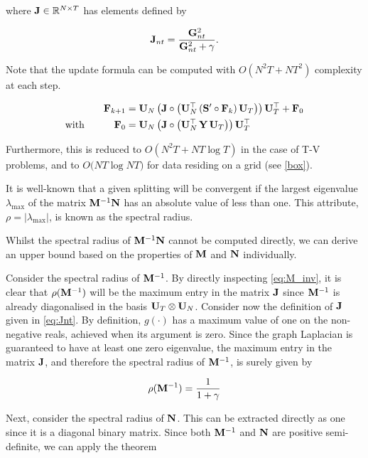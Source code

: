 \noindent where $\mathbf{J} \in \mathbb{R}^{N \times T}$ has elements defined by

\begin{equation}
    \label{eq:Jnt}
    \mathbf{J}_{nt} = \frac{\mathbf{G}_{nt}^2}{\mathbf{G}_{nt}^2 + \gamma}.
\end{equation}

Note that the update formula can be computed with $O(N^2T + NT^2)$ complexity at each step.  


\begin{align}
    \label{eq:update3}
    \mathbf{F}_{k+1} & = \mathbf{U}_N \, \big( \mathbf{J}  \circ \big( \mathbf{U}_N^\top \, (\mathbf{S}' \circ \mathbf{F}_{k})\, \mathbf{U}_T \big) \big) \, \mathbf{U}_T^\top + \mathbf{F}_0 \\
    \label{eq:update4}
    \text{with} \quad\quad\quad \mathbf{F}_0 & = \mathbf{U}_N \, \big( \mathbf{J}  \circ \big( \mathbf{U}_N^\top \, \mathbf{Y} \, \mathbf{U}_T \big) \big) \, \mathbf{U}_T^\top 
\end{align}


Furthermore, this is reduced to $O(N^2T + NT \log T)$ in the case of T-V problems, and to $O\big(NT \log NT \big)$ for data residing on a grid (see \cref{box}). 


It is well-known that a given splitting will be convergent if the largest eigenvalue $\lambda_{\text{max}}$ of the matrix $\mathbf{M}^{-1}\mathbf{N}$ has an absolute value of less than one. This attribute, $\rho = |\lambda_{\text{max}}|$, is known as the spectral radius. 

Whilst the spectral radius of $\mathbf{M}^{-1}\mathbf{N}$ cannot be computed directly, we can derive an upper bound based on the properties of $\mathbf{M}$ and $\mathbf{N}$ individually. 

Consider the spectral radius of $\mathbf{M}^{-1}$. By directly inspecting \cref{eq:M_inv}, it is clear that $\rho(\mathbf{M}^{-1})$ will be the maximum entry in the matrix $\mathbf{J}$ since $\mathbf{M}^{-1}$ is already diagonalised in the basis $\mathbf{U}_T \otimes \mathbf{U}_N$. Consider now the definition of $\mathbf{J}$ given in \cref{eq:Jnt}. By definition, $g(\cdot)$ has a maximum value of one on the non-negative reals, achieved when its argument is zero. Since the graph Laplacian is guaranteed to have at least one zero eigenvalue, the maximum entry in the matrix $\mathbf{J}$, and therefore the spectral radius of $\mathbf{M}^{-1}$, is surely given by

\begin{equation}
    \rho(\mathbf{M}^{-1}) = \frac{1}{1 + \gamma}
\end{equation}

Next, consider the spectral radius of $\mathbf{N}$. This can be extracted directly as one since it is a diagonal binary matrix. Since both $\mathbf{M}^{-1}$ and $\mathbf{N}$ are positive semi-definite, we can apply the theorem

